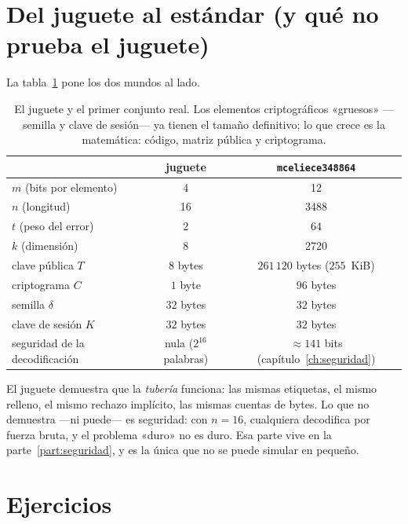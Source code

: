 \documentclass[11pt,a4paper,oneside]{report}
\begin{document}
\section{Del juguete al estándar (y qué no prueba el juguete)}

La tabla~\ref{tab:labkem-toy-real} pone los dos mundos al lado.

\begin{table}[htbp]
\centering
\small
\begin{tabular}{lcc}
\toprule
 & juguete & \texttt{mceliece348864}\\
\midrule
$m$ (bits por elemento) & 4 & 12\\
$n$ (longitud) & 16 & 3488\\
$t$ (peso del error) & 2 & 64\\
$k$ (dimensión) & 8 & 2720\\
clave pública $T$ & $8$ bytes & $261\,120$ bytes ($255$~KiB)\\
criptograma $C$ & $1$ byte & $96$ bytes\\
semilla $\delta$ & $32$ bytes & $32$ bytes\\
clave de sesión $K$ & $32$ bytes & $32$ bytes\\
seguridad de la decodificación & nula ($2^{16}$ palabras) & $\approx141$ bits
  (capítulo~\ref{ch:seguridad})\\
\bottomrule
\end{tabular}
\caption{El juguete y el primer conjunto real. Los elementos
criptográficos «gruesos» ---semilla y clave de sesión--- ya tienen el
tamaño definitivo; lo que crece es la matemática: código, matriz
pública y criptograma.}\label{tab:labkem-toy-real}
\end{table}

El juguete demuestra que la \emph{tubería} funciona: las mismas
etiquetas, el mismo relleno, el mismo rechazo implícito, las mismas
cuentas de bytes. Lo que no demuestra ---ni puede--- es seguridad: con
$n=16$, cualquiera decodifica por fuerza bruta, y el problema «duro» no
es duro. Esa parte vive en la
parte~\ref{part:seguridad}, y es la única que no se puede simular en
pequeño.

\section{Ejercicios}
\end{document}
